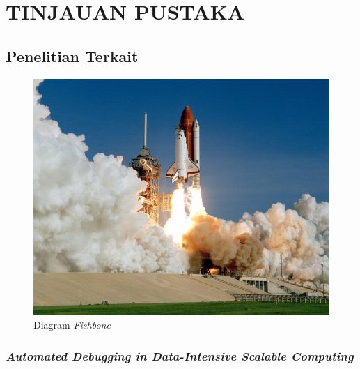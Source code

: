 \chapter{TINJAUAN PUSTAKA}
\label{chap:tinjauanpustaka}

\section{Penelitian Terkait}
\label{sec:penelitianTerkait}

\begin{figure}[H]
  \centering

  \includegraphics[scale=0.35]{gambar/roketluarangkasa.jpg}

  \caption{Diagram \emph{Fishbone}}
  \label{fig:fishbone}
\end{figure}

\subsection{\emph{Automated Debugging in Data-Intensive Scalable Computing}}
\label{subsec:Automated Debugging in Data-Intensive Scalable Computing}

